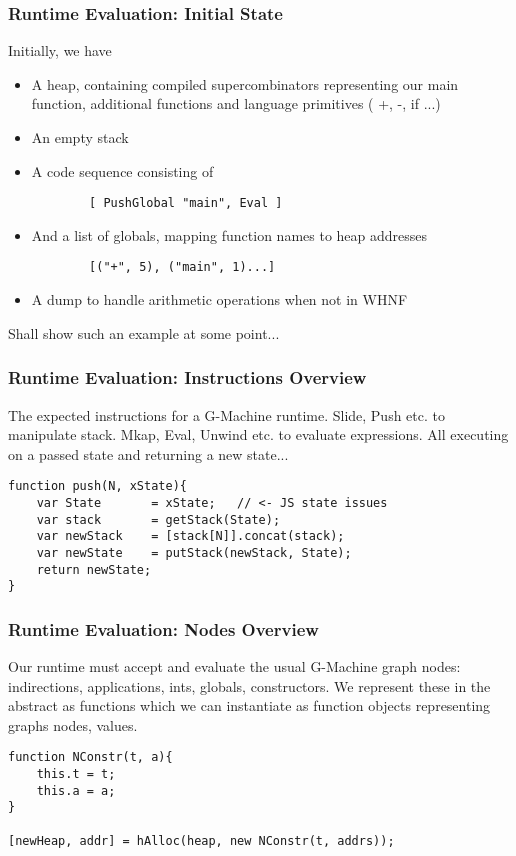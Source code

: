 \documentclass{beamer}
\begin{document}
\begin{frame}[fragile]
	\frametitle{Runtime Evaluation: Initial State}
	Initially, we have
	\begin{itemize}
		\item A heap, containing compiled supercombinators
			  representing our main function, additional 
			  functions and language primitives ( +, -, if ...)
		\item An empty stack
		\item A code sequence consisting of
		\begin{verbatim} 
		[ PushGlobal "main", Eval ]
		\end{verbatim} 
		\item And a list of globals, mapping function names
			  to heap addresses
		\begin{verbatim}
		[("+", 5), ("main", 1)...]
		\end{verbatim}
		\item A dump to handle arithmetic operations when not in
		WHNF
	\end{itemize}
	Shall show such an example at some point...
\end{frame}

\begin{frame}[fragile]
	\frametitle{Runtime Evaluation: Instructions Overview}
	The expected instructions for a G-Machine runtime.
	Slide, Push etc. to manipulate stack. Mkap, Eval, Unwind
	etc. to evaluate expressions. All executing on a passed
	state and returning a new state...
\begin{verbatim}
function push(N, xState){
    var State 		= xState;	// <- JS state issues
    var stack 		= getStack(State);
    var newStack	= [stack[N]].concat(stack);
    var newState 	= putStack(newStack, State);
    return newState; 
}
\end{verbatim}		
\end{frame}

\begin{frame}[fragile]
	\frametitle{Runtime Evaluation: Nodes Overview}
	Our runtime must accept and evaluate the usual G-Machine
	graph nodes: indirections, applications, ints, globals,
	constructors. We represent these in the abstract as functions
	which we can instantiate as function objects representing
	graphs nodes, values.

\begin{verbatim}
function NConstr(t, a){
    this.t = t;
    this.a = a;
}

[newHeap, addr] = hAlloc(heap, new NConstr(t, addrs));
\end{verbatim}

\end{frame}
\end{document}
